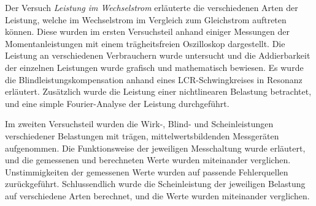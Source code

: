 
Der Versuch \textit{Leistung im Wechselstrom} erläuterte die verschiedenen Arten der Leistung, welche im Wechselstrom im Vergleich zum Gleichstrom auftreten können. Diese wurden im ersten Versuchsteil anhand einiger Messungen der Momentanleistungen mit einem trägheitsfreien Oszilloskop dargestellt. Die Leistung an verschiedenen Verbrauchern wurde untersucht und die Addierbarkeit der einzelnen Leistungen wurde grafisch und mathematisch bewiesen. Es wurde die Blindleistungskompensation anhand eines LCR-Schwingkreises in Resonanz erläutert. Zusätzlich wurde die Leistung einer nichtlinearen Belastung betrachtet, und eine simple Fourier-Analyse der Leistung durchgeführt.

Im zweiten Versuchsteil wurden die Wirk-, Blind- und Scheinleistungen verschiedener Belastungen mit trägen, mittelwertsbildenden Messgeräten aufgenommen. Die Funktionsweise der jeweiligen Messchaltung wurde erläutert, und die gemessenen und berechneten Werte wurden miteinander verglichen. Unstimmigkeiten der gemessenen Werte wurden auf passende Fehlerquellen zurückgeführt. Schlussendlich wurde die Scheinleistung der jeweiligen Belastung auf verschiedene Arten berechnet, und die Werte wurden miteinander verglichen.